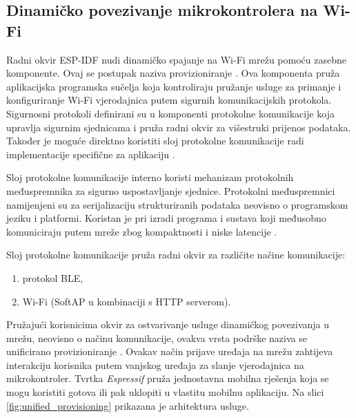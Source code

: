 \subsection{Dinamičko povezivanje mikrokontrolera na Wi-Fi}

Radni okvir ESP-IDF nudi dinamičko spajanje na Wi-Fi mrežu pomoću zasebne komponente. Ovaj se postupak naziva provizioniranje . Ova komponenta pruža aplikacijska programska sučelja  koja kontroliraju pružanje usluge za primanje i konfiguriranje Wi-Fi vjerodajnica putem sigurnih komunikacijskih protokola. Sigurnosni protokoli definirani su u komponenti protokolne komunikacije  koja upravlja sigurnim sjednicama  i pruža radni okvir za višestruki prijenos podataka. Također je moguće direktno koristiti sloj protokolne komunikacije radi implementacije specifične za aplikaciju \cite{unified_provisioning}.

Sloj protokolne komunikacije interno koristi mehanizam protokolnih međuspremnika  za sigurno uspostavljanje sjednice. Protokolni međuspremnici namijenjeni su za serijalizaciju strukturiranih podataka neovisno o programskom jeziku i platformi. Koristan je pri izradi programa i sustava koji međusobno komuniciraju putem mreže zbog kompaktnosti i niske latencije \cite{what_is_protobuf}.

Sloj protokolne komunikacije pruža radni okvir za različite načine komunikacije:
\begin{enumerate}
	\item protokol BLE,
	\item Wi-Fi (SoftAP u kombinaciji s HTTP serverom).
\end{enumerate}

Pružajući korisnicima okvir za ostvarivanje usluge dinamičkog povezivanja u mrežu, neovisno o načinu komunikacije, ovakva vrsta podrške naziva se unificirano provizioniranje . Ovakav način prijave uređaja na mrežu zahtijeva interakciju korisnika putem vanjskog uređaja za slanje vjerodajnica na mikrokontroler. Tvrtka \textit{Espressif} pruža jednostavna mobilna rješenja koja se mogu koristiti gotova ili pak uklopiti u vlastitu mobilnu aplikaciju. Na slici \ref{fig:unified_provisioning} prikazana je arhitektura usluge.


